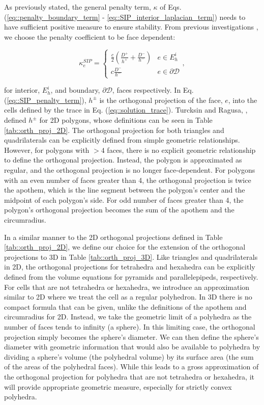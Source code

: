 \noindent As previously stated, the general penalty term, $\kappa$ of Eqs. (\ref{eq::penalty_boundary_term} - \ref{eq::SIP_interior_laplacian_term}) needs to have sufficient positive measure to ensure stability. From previous investigations \cite{ref::DSA_wang_ragusa,wang2009adaptive,turcksin2014discontinuous}, we choose the penalty coefficient to be face dependent:

\begin{equation}
\kappa_e^{SIP} = 
\begin{cases}
	\frac{c}{2} \left(  \frac{D^+}{h^+} + \frac{D^-}{h^-} \right) & e \in E_h^i\\ 
	c \frac{D^-}{h^-}& e \in \partial \mathcal{D}
\end{cases},
\label{eq::SIP_penalty_term}
\end{equation}

\noindent for interior, $E_h^i$, and boundary, $\partial \mathcal{D}$, faces respectively. In Eq. (\ref{eq::SIP_penalty_term}), $h^\pm$ is the orthogonal projection of the face, $e$, into the cells defined by the trace in Eq. (\ref{eq::solution_trace}). Turcksin and Ragusa, \cite{turcksin2014discontinuous}, defined $h^\pm$ for 2D polygons, whose definitions can be seen in Table \ref{tab::orth_proj_2D}. The orthogonal projection for both triangles and quadrilaterals can be explicitly defined from simple geometric relationships. However, for polygons with $>4$ faces, there is no explicit geometric relationship to define the orthogonal projection. Instead, the polygon is approximated as regular, and the orthogonal projection is no longer face-dependent. For polygons with an even number of faces greater than 4, the orthogonal projection is twice the apothem, which is the line segment between the polygon's center and the midpoint of each polygon's side. For odd number of faces greater than 4, the polygon's orthogonal projection becomes the sum of the apothem and the circumradius.

 In a similar manner to the 2D orthogonal projections defined in Table \ref{tab::orth_proj_2D}, we define our choice for the extension of the orthogonal projections to 3D in Table \ref{tab::orth_proj_3D}. Like triangles and quadrilaterals in 2D, the orthogonal projections for tetrahedra and hexahedra can be explicitly defined from the volume equations for pyramids and parallelepipeds, respectively. For cells that are not tetrahedra or hexahedra, we introduce an approximation similar to 2D where we treat the cell as a regular polyhedron. In 3D there is no compact formula that can be given, unlike the definitions of the apothem and circumradius for 2D. Instead, we take the geometric limit of a polyhedra as the number of faces tends to infinity (a sphere). In this limiting case, the orthogonal projection simply becomes the sphere's diameter. We can then define the sphere's diameter with geometric information that would also be available to polyhedra by dividing a sphere's volume (the polyhedral volume) by its surface area (the sum of the areas of the polyhedral faces). While this leads to a gross approximation of the orthogonal projection for polyhedra that are not tetrahedra or hexahedra, it will provide appropriate geometric measure, especially for strictly convex polyhedra.

